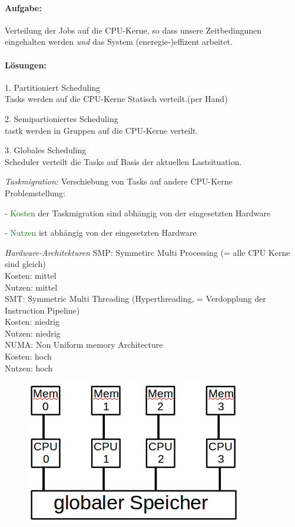 \documentclass[12pt,a4paper,oneside,ngerman]{article}
\begin{document}
\paragraph{Aufgabe:}
Verteilung der Jobs auf die CPU-Kerne, so dass unsere Zeitbedingunen eingehalten werden \emph{und} das System (eneregie-)effizent arbeitet.

\paragraph{Lösungen:}
\begin{description}
	\item 1. Partitioniert Scheduling\\ Tasks werden auf die CPU-Kerne Statisch verteilt.(per Hand)
	\item 2. Semipartioniertes Scheduling\\ tastk werden in Gruppen auf die CPU-Kerne verteilt.
	\item 3. Globales Scheduling\\ Scheduler verteilt die Tasks auf Basis der aktuellen Lastsituation.
\end{description}

\emph{Taskmigration:} Verschiebung von Tasks auf andere CPU-Kerne\\
Problemstellung:
\begin{description}
	\item - \textcolor{green}{Kosten} der Taskmigration sind abhängig von der eingesetzten Hardware
	\item - \textcolor{green}{Nutzen} ist abhängig von der eingesetzten Hardware
\end{description}

\emph{Hardware-Architekturen}
SMP: Symmetirc Multi Processing (= alle CPU Kerne sind gleich)\\
Kosten: mittel\\
Nutzen: mittel\\
SMT: Symmetric Multi Threading (Hyperthreading, = Verdopplung der Instruction Pipeline)\\
Kosten: niedrig\\
Nutzen: niedrig\\
NUMA: Non Uniform memory Architecture\\
Kosten: hoch\\
Nutzen: hoch\\

\begin{figure}[H]
	\centering
	\includegraphics[scale=0.4]{umlet/numa.png}
\end{figure}
\end{document}
